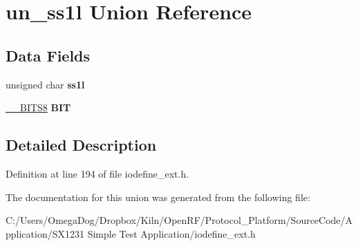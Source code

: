 \hypertarget{unionun__ss1l}{\section{un\-\_\-ss1l Union Reference}
\label{unionun__ss1l}
}
\subsection*{Data Fields}
\begin{DoxyCompactItemize}
\item 
\hypertarget{unionun__ss1l_a53e865718431a74077ee0e17d2ccff17}{unsigned char {\bfseries ss1l}}\label{unionun__ss1l_a53e865718431a74077ee0e17d2ccff17}

\item 
\hypertarget{unionun__ss1l_abe3f7160cb9e5f9a6256a8dfecea8959}{\hyperlink{struct_____b_i_t_s8}{\-\_\-\-\_\-\-B\-I\-T\-S8} {\bfseries B\-I\-T}}\label{unionun__ss1l_abe3f7160cb9e5f9a6256a8dfecea8959}

\end{DoxyCompactItemize}


\subsection{Detailed Description}


Definition at line 194 of file iodefine\-\_\-ext.\-h.



The documentation for this union was generated from the following file\-:\begin{DoxyCompactItemize}
\item 
C\-:/\-Users/\-Omega\-Dog/\-Dropbox/\-Kiln/\-Open\-R\-F/\-Protocol\-\_\-\-Platform/\-Source\-Code/\-Application/\-S\-X1231 Simple Test Application/iodefine\-\_\-ext.\-h\end{DoxyCompactItemize}
